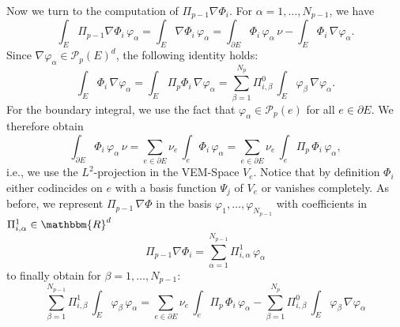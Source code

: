 \documentclass{article}
\newcommand{\setR}{\mathbbm{R}}
\begin{document}
Now we turn to the computation of $\Pi_{p-1} \nabla \Phi_i$.
For $\alpha = 1, \ldots, N_{p-1}$, we have
\begin{equation*}
  \int_E \Pi_{p-1} \nabla \Phi_i\,\varphi_\alpha
    = \int_E \nabla \Phi_i\,\varphi_\alpha
    = \int_{\partial E} \Phi_i\,\varphi_\alpha\,\nu - \int_E \Phi_i\,\nabla \varphi_\alpha.
\end{equation*}
Since $\nabla \varphi_\alpha \in \mathcal{P}_p( E )^d$, the following identity holds:
\begin{equation*}
  \int_E \Phi_i\,\nabla \varphi_\alpha
    = \int_E \Pi_p \Phi_i\,\nabla \varphi_\alpha
    = \sum_{\beta=1}^{N_p} \Pi^0_{i, \beta}\,\int_E \varphi_\beta\,\nabla \varphi_\alpha.
\end{equation*}
For the boundary integral, we use the fact that $\varphi_\alpha \in \mathcal{P}_p( e )$
for all $e \in \partial E$.
We therefore obtain
\begin{equation*}
  \int_{\partial E} \Phi_i\,\varphi_\alpha\,\nu
    = \sum_{e \in \partial E} \nu_e\,\int_e \Phi_i\,\varphi_\alpha
    = \sum_{e \in \partial E} \nu_e\,\int_e \Pi_p\,\Phi_i\,\varphi_\alpha,
\end{equation*}
i.e., we use the $L^2$-projection in the VEM-Space $V_e$.
Notice that by definition $\Phi_i$ either codincides on $e$ with a basis function
$\Psi_j$ of $V_e$ or vanishes completely.
As before, we represent $\Pi_{p-1}\,\nabla \Phi$ in the basis
$\varphi_1, \ldots, \varphi_{N_{p-1}}$ with coefficients in
$\Pi^1_{i,\alpha} \in \setR^d$
\begin{equation*}
  \Pi_{p-1} \nabla \Phi_i = \sum_{\alpha=1}^{N_{p-1}} \Pi^1_{i,\alpha}\,\varphi_\alpha
\end{equation*}
to finally obtain for $\beta = 1, \ldots, N_{p-1}$:
\begin{equation*}
  \sum_{\beta=1}^{N_{p-1}} \Pi^1_{i, \beta}\,\int_E \varphi_\beta\,\varphi_\alpha
  = \sum_{e \in \partial E} \nu_e\,\int_e \Pi_p\,\Phi_i\,\varphi_\alpha
    - \sum_{\beta=1}^{N_p} \Pi^0_{i, \beta}\,\int_E \varphi_\beta\,\nabla \varphi_\alpha
\end{equation*}
\end{document}
